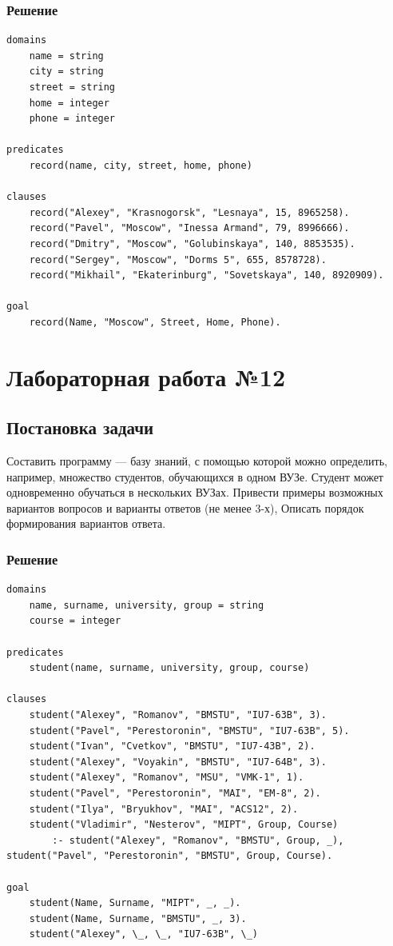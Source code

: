 \documentclass[12pt]{report}
\begin{document}
\subsection*{Решение}
\begin{lstlisting}
domains
	name = string
	city = string
	street = string
	home = integer
	phone = integer

predicates
	record(name, city, street, home, phone)

clauses
	record("Alexey", "Krasnogorsk", "Lesnaya", 15, 8965258).
	record("Pavel", "Moscow", "Inessa Armand", 79, 8996666).
	record("Dmitry", "Moscow", "Golubinskaya", 140, 8853535).
	record("Sergey", "Moscow", "Dorms 5", 655, 8578728).
	record("Mikhail", "Ekaterinburg", "Sovetskaya", 140, 8920909).

goal
	record(Name, "Moscow", Street, Home, Phone).
\end{lstlisting}

\chapter*{Лабораторная работа №12}
\section*{Постановка задачи}
Составить программу — базу знаний, с помощью которой можно определить, например, множество студентов, обучающихся в одном ВУЗе. Студент может одновременно обучаться в нескольких ВУЗах. Привести примеры возможных вариантов вопросов и варианты ответов (не менее 3-х), Описать порядок формирования вариантов ответа.

\subsection*{Решение}
\begin{lstlisting}
domains 
	name, surname, university, group = string
	course = integer

predicates
	student(name, surname, university, group, course)

clauses
	student("Alexey", "Romanov", "BMSTU", "IU7-63B", 3).
	student("Pavel", "Perestoronin", "BMSTU", "IU7-63B", 5).
	student("Ivan", "Cvetkov", "BMSTU", "IU7-43B", 2).
	student("Alexey", "Voyakin", "BMSTU", "IU7-64B", 3).
	student("Alexey", "Romanov", "MSU", "VMK-1", 1).
	student("Pavel", "Perestoronin", "MAI", "EM-8", 2).
	student("Ilya", "Bryukhov", "MAI", "ACS12", 2).
	student("Vladimir", "Nesterov", "MIPT", Group, Course) 
		:- student("Alexey", "Romanov", "BMSTU", Group, _),  student("Pavel", "Perestoronin", "BMSTU", Group, Course).

goal
	student(Name, Surname, "MIPT", _, _).
	student(Name, Surname, "BMSTU", _, 3).
	student("Alexey", \_, \_, "IU7-63B", \_)
\end{lstlisting}
\end{document}
